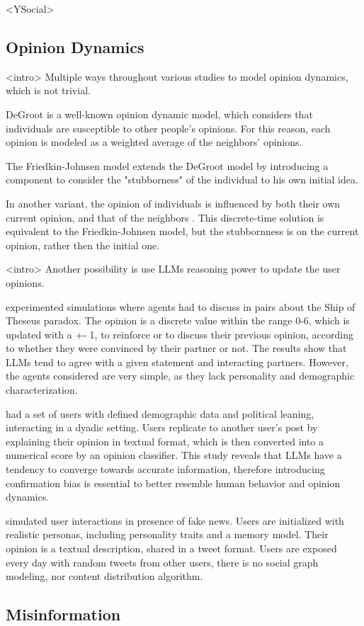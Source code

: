 <YSocial>












\subsection{Opinion Dynamics}
<intro> Multiple ways throughout various studies to model opinion dynamics, which is not trivial.

DeGroot is a well-known opinion dynamic model, which considers that individuals are susceptible to other people's opinions. For this reason, each opinion is modeled as a weighted average of the neighbors' opinions.

The Friedkin-Johnsen model \cite{article} extends the DeGroot model by introducing a component to consider the "stubborness" of the individual to his own initial idea. 

In another variant, the opinion of individuals is influenced by both their own current opinion, and that of the neighbors \cite{Ye2018Opinion, Liu_2018}. This discrete-time solution is equivalent to the Friedkin-Johnsen model, but the stubbornness is on the current opinion, rather then the initial one.


<intro> Another possibility is use LLMs reasoning power to update the user opinions.

\citet{cau2025languagedrivenopiniondynamicsagentbased} experimented simulations where agents had to discuss in pairs about the Ship of Theseus paradox.
The opinion is a discrete value within the range 0-6, which is updated with a +- 1,  to reinforce or to discuss their previous opinion, according to whether they were convinced by their partner or not.
The results show that LLMs tend to agree with a given statement and interacting partners. However, the agents considered are very simple, as they lack personality and demographic characterization.

\citet{chuang2024simulatingopiniondynamicsnetworks} had a set of users with defined demographic data and political leaning, interacting in a dyadic setting. Users replicate to another user's post by explaining their opinion in textual format, which is then converted into a numerical score by an opinion classifier.
This study reveals that LLMs have a tendency to converge towards accurate information, therefore introducing confirmation bias is essential to better resemble human behavior and opinion dynamics.

\citet{Liu_2024} simulated user interactions in presence of fake news. Users are initialized with realistic personas, including personality traits and a memory model. Their opinion is a textual description, shared in a tweet format. 
Users are exposed every day with random tweets from other users, there is no social graph modeling, nor content distribution algorithm.

\subsection{Misinformation}
